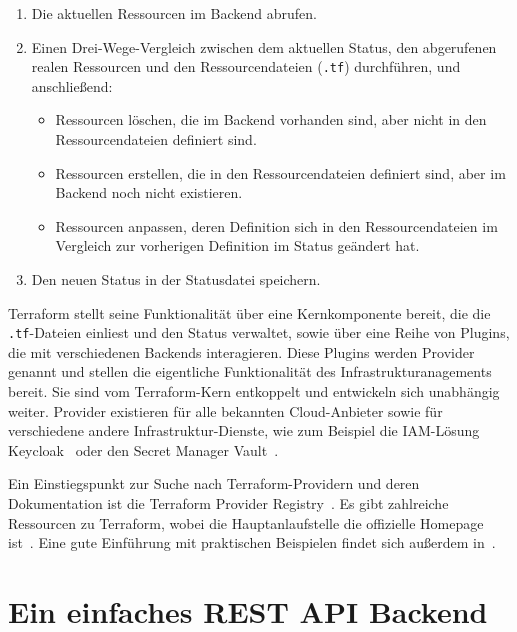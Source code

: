 \documentclass[paper=a4,11pt,numbers=noenddot]{article}
\begin{document}
\begin{enumerate}
\item\label{itm:tf-read} Die aktuellen Ressourcen im Backend abrufen.
\item\label{itm:tf-compare} Einen Drei-Wege-Vergleich zwischen dem aktuellen Status, den abgerufenen realen Ressourcen und den Ressourcendateien (\verb'.tf') durchführen, und anschließend:
  \begin{itemize}
  \item Ressourcen löschen, die im Backend vorhanden sind, aber nicht in den Ressourcendateien definiert sind.
  \item Ressourcen erstellen, die in den Ressourcendateien definiert sind, aber im Backend noch nicht existieren.
  \item Ressourcen anpassen, deren Definition sich in den Ressourcendateien im Vergleich zur vorherigen Definition im Status geändert hat.
  \end{itemize}
\item\label{itm:tf-create-update} Den neuen Status in der Statusdatei speichern.
\end{enumerate}

Terraform stellt seine Funktionalität über eine Kernkomponente bereit, die die \verb'.tf'-Dateien einliest und den Status verwaltet, sowie über eine Reihe von Plugins, die mit verschiedenen Backends interagieren. Diese Plugins werden Provider genannt und stellen die eigentliche Funktionalität des Infrastrukturanagements bereit. Sie sind vom Terraform-Kern entkoppelt und entwickeln sich unabhängig weiter. Provider existieren für alle bekannten Cloud-Anbieter sowie für verschiedene andere Infrastruktur-Dienste, wie zum Beispiel die IAM-Lösung Keycloak~\autocite{team_keycloak_nodate} oder den Secret Manager Vault~\autocite{noauthor_vault_nodate}.

Ein Einstiegspunkt zur Suche nach Terraform-Providern und deren Dokumentation ist die Terraform Provider Registry~\autocite{noauthor_terraform_registry_nodate}. Es gibt zahlreiche Ressourcen zu Terraform, wobei die Hauptanlaufstelle die offizielle Homepage ist~\autocite{noauthor_terraform_nodate}. Eine gute Einführung mit praktischen Beispielen findet sich außerdem in~\autocite{brikman_terraform_2022}.

\section{Ein einfaches REST API Backend}
\label{sec:simple-rest-api}
\end{document}
